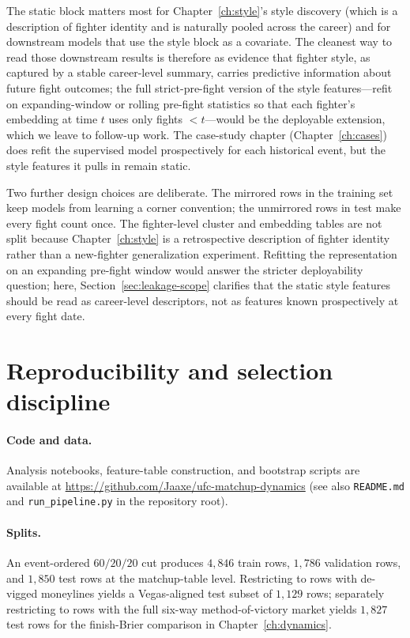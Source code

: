 \documentclass[12pt,oneside]{report}
\begin{document}
The static block matters most for Chapter~\ref{ch:style}'s style
discovery (which is a description of fighter identity and is
naturally pooled across the career) and for downstream models that
use the style block as a covariate.  The cleanest way to read those
downstream results is therefore as evidence that fighter style,
as captured by a stable career-level summary, carries
predictive information about future fight outcomes; the full
strict-pre-fight version of the style features---refit on
expanding-window or rolling pre-fight statistics so that each
fighter's embedding at time $t$ uses only fights $<t$---would be the
deployable extension, which we leave to follow-up work.  The
case-study chapter (Chapter~\ref{ch:cases}) does refit the
supervised model prospectively for each historical event,
but the style features it pulls in remain static.

Two further design choices are deliberate.  The mirrored rows in
the training set keep models from learning a corner convention; the
unmirrored rows in test make every fight count once.  The
fighter-level cluster and embedding tables are not split because
Chapter~\ref{ch:style} is a retrospective description of fighter
identity rather than a new-fighter generalization experiment.
Refitting the representation on an expanding pre-fight window would
answer the stricter deployability question; here,
Section~\ref{sec:leakage-scope} clarifies that the static style
features should be read as career-level descriptors, not as features
known prospectively at every fight date.

\section{Reproducibility and selection discipline}\label{sec:repro}

\paragraph{Code and data.}  Analysis notebooks, feature-table construction, and bootstrap scripts are available at \url{https://github.com/Jaaxe/ufc-matchup-dynamics} (see also \texttt{README.md} and \texttt{run\_pipeline.py} in the repository root).

\paragraph{Splits.}  An event-ordered $60/20/20$ cut produces
$4{,}846$ train rows, $1{,}786$ validation rows, and $1{,}850$
test rows at the matchup-table level.  Restricting to rows with
de-vigged moneylines yields a Vegas-aligned test subset of $1{,}129$
rows; separately restricting to rows with the full six-way
method-of-victory market yields $1{,}827$ test rows for the
finish-Brier comparison in Chapter~\ref{ch:dynamics}.
\end{document}
